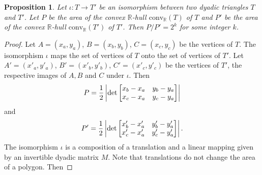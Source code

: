 \documentclass[12pt]{amsart}
\def\mr{\mathrm}
\def\mbR{\mathbb{R}}
\theoremstyle{plain}
\newtheorem{proposition}[theorem]{Proposition}
\theoremstyle{definition}
\numberwithin{equation}{section}
\begin{document}
\begin{proposition}\label{P:area}
Let $\iota:T \rightarrow T'$ be an isomorphism between two dyadic triangles $T$ and $T'$. Let
$P$ be the area of the convex $\mbR$-hull $\mr{conv}_{\mbR}(T)$ of $T$ and $P'$ be the area of
the convex $\mbR$-hull $\mr{conv}_{\mbR}(T')$ of $T'$. Then $ P/P' = 2^k$ for some integer $k$.
\end{proposition}
\begin{proof}
Let $A = (x_a,y_a)$, $B = (x_b,y_b)$, $C = (x_c,y_c)$ be the vertices of $T$. The isomorphism
$\iota$ maps the set of vertices of $T$ onto the set of vertices of $T'$. Let $A' =
(x'_a,y'_a)$, $B' = (x'_b,y'_b)$, $C' = (x'_c,y'_c)$ be the vertices of $T'$, the respective
images of $A,B$ and $C$ under $\iota$.
Then	
\[
		P = \frac{1}{2}\left| \rm{det}
		\begin{bmatrix}
			x_b-x_a&y_b-y_a\\
		    x_c-x_a&y_c-y_a
		\end{bmatrix}\right|
\]	
and
\[
		P' = \frac{1}{2} \left|\rm{det}
		\begin{bmatrix}
			x'_b-x'_a&y'_b-y'_a\\
			x'_c-x'_a&y'_c-y'_a
		\end{bmatrix}\right|.
\]
The isomorphism $\iota$ is a composition of a translation and a linear mapping given by an
invertible dyadic matrix $M$. Note that translations do not change the area of a polygon. Then


\end{proof}
\end{document}
